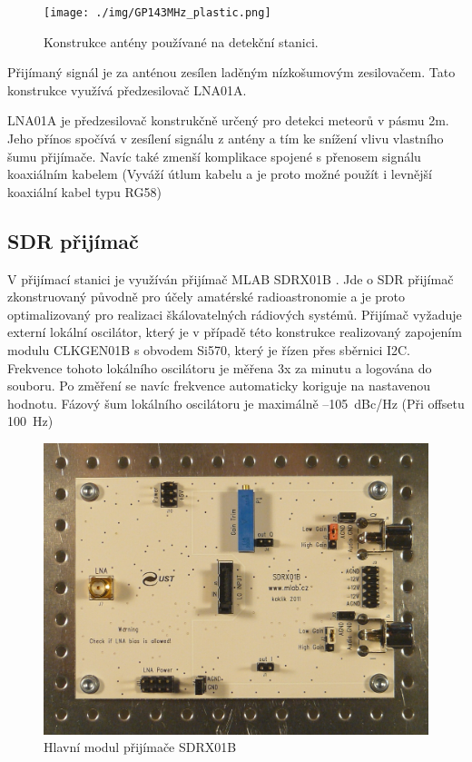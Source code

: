 \documentclass[12pt,a4paper,oneside]{article}
\begin{document}
\begin{figure}[htbp]
\begin{center}
\texttt{[image: ./img/GP143MHz\_plastic.png]} 
\end{center}
\caption{Konstrukce antény používané na detekční stanici.}
\end{figure}

Přijímaný signál je za anténou zesílen laděným nízkošumovým zesilovačem. Tato konstrukce využívá předzesilovač LNA01A\cite{LNA01A_wiki}.

LNA01A je předzesilovač konstrukčně určený pro detekci meteorů v pásmu 2m. Jeho přínos spočívá v zesílení signálu z antény a tím ke snížení vlivu vlastního šumu přijímače. Navíc také zmenší komplikace spojené s přenosem signálu koaxiálním kabelem (Vyváží útlum kabelu a je proto možné použít i levnější koaxiální kabel typu RG58) 

\subsection{SDR přijímač}

V přijímací stanici je využíván přijímač MLAB SDRX01B \cite{SDRX01B_pdf}. Jde o SDR přijímač zkonstruovaný původně pro účely amatérské radioastronomie a je proto optimalizovaný pro realizaci škálovatelných rádiových systémů. Přijímač vyžaduje externí lokální oscilátor, který je v případě této konstrukce realizovaný zapojením modulu CLKGEN01B s obvodem Si570, který je řízen přes sběrnici I2C.  Frekvence tohoto lokálního oscilátoru je měřena 3x za minutu a logována do souboru. Po změření se navíc frekvence automaticky koriguje na nastavenou hodnotu. Fázový šum lokálního oscilátoru je maximálně –105~dBc/Hz (Při offsetu 100~Hz)

\begin{figure}[htbp]
\begin{center}
\includegraphics [width=120mm] {./img/SDRX01B_Top_Big.JPG} 
\end{center}
\caption{Hlavní modul přijímače SDRX01B}
\end{figure}
\end{document}
